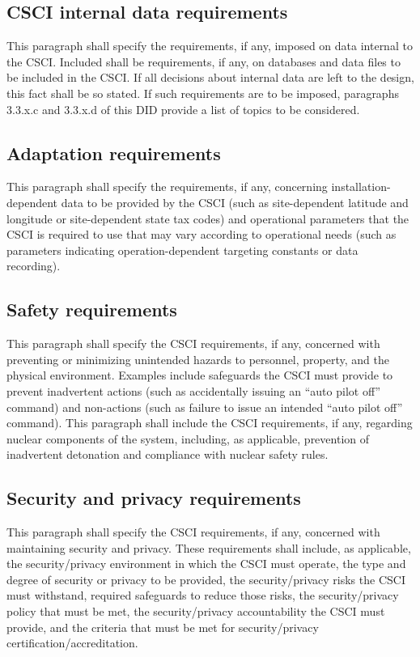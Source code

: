 \subsection{CSCI internal data requirements}

This paragraph shall specify the requirements, if any, imposed on data
internal to the CSCI. Included shall be requirements, if any, on
databases and data files to be included in the CSCI. If all decisions
about internal data are left to the design, this fact shall be so
stated. If such requirements are to be imposed, paragraphs 3.3.x.c and
3.3.x.d of this DID provide a list of topics to be considered.

\subsection{Adaptation requirements}

This paragraph shall specify the requirements, if any, concerning
installation-dependent data to be provided by the CSCI (such as
site-dependent latitude and longitude or site-dependent state tax codes)
and operational parameters that the CSCI is required to use that may
vary according to operational needs (such as parameters indicating
operation-dependent targeting constants or data recording).

\subsection{Safety requirements}

This paragraph shall specify the CSCI requirements, if any, concerned
with preventing or minimizing unintended hazards to personnel, property,
and the physical environment. Examples include safeguards the CSCI must
provide to prevent inadvertent actions (such as accidentally issuing an
``auto pilot off'' command) and non-actions (such as failure to issue an
intended ``auto pilot off'' command). This paragraph shall include the
CSCI requirements, if any, regarding nuclear components of the system,
including, as applicable, prevention of inadvertent detonation and
compliance with nuclear safety rules.

\subsection{Security and privacy requirements}

This paragraph shall specify the CSCI requirements, if any, concerned
with maintaining security and privacy. These requirements shall include,
as applicable, the security/privacy environment in which the CSCI must
operate, the type and degree of security or privacy to be provided, the
security/privacy risks the CSCI must withstand, required safeguards to
reduce those risks, the security/privacy policy that must be met, the
security/privacy accountability the CSCI must provide, and the criteria
that must be met for security/privacy certification/accreditation.

